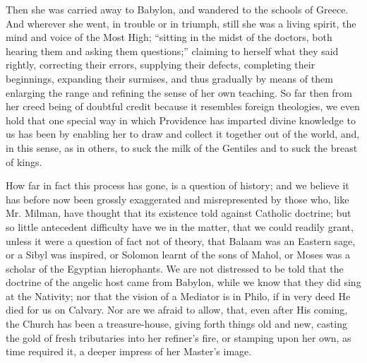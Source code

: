 Then she was carried away to Babylon, and wandered to the schools of
Greece. And wherever she went, in trouble or in triumph, still she was
a living spirit, the mind and voice of the Most High; ``sitting in the
midst of the doctors, both hearing them and asking them questions;''
claiming to herself what they said rightly, correcting their errors,
supplying their defects, completing their beginnings, expanding their
surmises, and thus gradually by means of them enlarging the range and
refining the sense of her own teaching. So far then from her creed
being of doubtful credit because it resembles foreign theologies, we
even hold that one special way in which Providence has imparted divine
knowledge to us has been by enabling her to draw and collect it
together out of the world, and, in this sense, as in others, to suck
the milk of the Gentiles and to suck the breast of kings.

How far in fact this process has gone, is a
question of history; and we believe it has before now been grossly
exaggerated and misrepresented by those who, like Mr. Milman, have
thought that its existence told against Catholic doctrine; but
so little antecedent difficulty have we in the matter, that we could
readily grant, unless it were a question of fact not of theory, that
Balaam was an Eastern sage, or a Sibyl was inspired, or Solomon learnt
of the sons of Mahol, or Moses was a scholar of the Egyptian
hierophants. We are not distressed to be told that the doctrine of the
angelic host came from Babylon, while we know that they did sing at
the Nativity; nor that the vision of a Mediator is in Philo, if in
very deed He died for us on Calvary. Nor are we afraid to allow, that,
even after His coming, the Church has been a treasure-house, giving
forth things old and new, casting the gold of fresh tributaries into
her refiner's fire, or stamping upon her own, as time required it, a
deeper impress of her Master's image.

